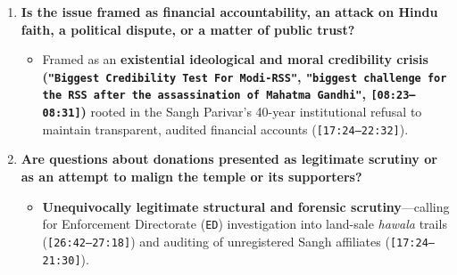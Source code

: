 \documentclass[10pt,a4paper]{article}
\begin{document}
\begin{enumerate}[leftmargin=1.6em, itemsep=4pt, topsep=4pt]
\begin{itemize}[leftmargin=1.4em, itemsep=2pt, topsep=2pt]
    \item \textbf{Donors:} Portrayed with sociological nuance---on one hand sincere devotees from the 1989 \textit{Ram Shila Yatras} onward who \texttt{"put their body and soul into this movement"} only to find \texttt{"the darshan has been hollowed out, that it has been stolen"} (\texttt{[36:28--37:08]}), and on the other hand rational-losing \texttt{"bhakts"} viewing Modi as \texttt{"not just a biological being"} who might \texttt{"overlook anything"} (\texttt{[02:18--02:27]}, \texttt{[35:43--36:20]}).
    \item \textbf{People Making Allegations:} Highlights \textbf{internal Hindu/movement critics}---specifically dissenting orders like \texttt{Nirmohi Akhada} (\texttt{[ASR: Nirmala Akada]}, \texttt{[29:11--29:38]}) calling Sangh Parivar trustees \texttt{"all thieves"} after being excluded from the Trust, alongside historical references to honest 1990 Income Tax Deputy Commissioner \texttt{Vishwa Bandhu Gupta} (\texttt{[ASR: Vishva Hindu Gupta]}, \texttt{[15:33--17:15]}) and Karnataka minister \texttt{Priyank Kharge} (\texttt{[18:59--19:09]}).
  \end{itemize}
  \item \textbf{Is the issue framed as financial accountability, an attack on Hindu faith, a political dispute, or a matter of public trust?}
  \begin{itemize}[leftmargin=1.4em, itemsep=2pt, topsep=2pt]
    \item Framed as an \textbf{existential ideological and moral credibility crisis (\texttt{"Biggest Credibility Test For Modi-RSS"}, \texttt{"biggest challenge for the RSS after the assassination of Mahatma Gandhi"}, \texttt{[08:23--08:31]})} rooted in the Sangh Parivar's 40-year institutional refusal to maintain transparent, audited financial accounts (\texttt{[17:24--22:32]}).
  \end{itemize}
  \item \textbf{Are questions about donations presented as legitimate scrutiny or as an attempt to malign the temple or its supporters?}
  \begin{itemize}[leftmargin=1.4em, itemsep=2pt, topsep=2pt]
    \item \textbf{Unequivocally legitimate structural and forensic scrutiny}---calling for Enforcement Directorate (\texttt{ED}) investigation into land-sale \textit{hawala} trails (\texttt{[26:42--27:18]}) and auditing of unregistered Sangh affiliates (\texttt{[17:24--21:30]}).
  \end{itemize}

\end{enumerate}
\end{document}
